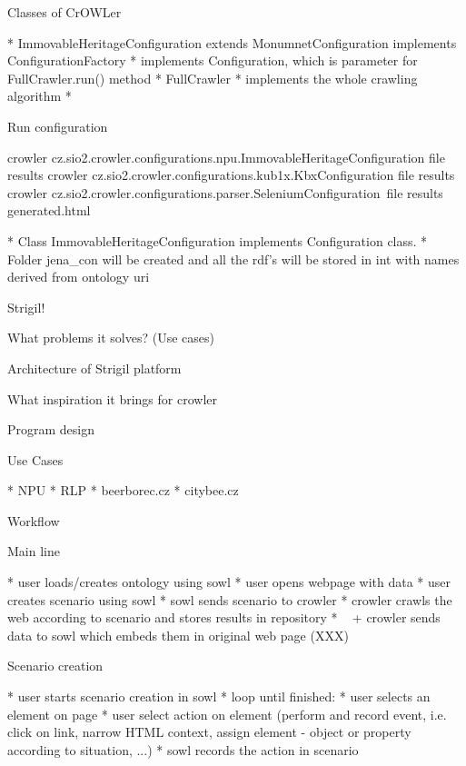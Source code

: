 \secc Classes of CrOWLer

\begitems
  * ImmovableHeritageConfiguration extends MonumnetConfiguration implements ConfigurationFactory 
  \begitems
    * implements Configuration, which is parameter for FullCrawler.run() method
  \enditems
  * FullCrawler
  \begitems
    * implements the whole crawling algorithm
    * 
  \enditems
\enditems

\secc Run configuration 

\begtt
crowler cz.sio2.crowler.configurations.npu.ImmovableHeritageConfiguration file results
crowler cz.sio2.crowler.configurations.kub1x.KbxConfiguration file results
crowler cz.sio2.crowler.configurations.parser.SeleniumConfiguration\
         file results generated.html
\endtt

\begitems
  * Class ImmovableHeritageConfiguration implements Configuration class. 
  * Folder jena\_con will be created and all the rdf's will be stored in int with names derived from ontology uri
\enditems



\sec Strigil!

\secc What problems it solves? (Use cases)

\secc Architecture of Strigil platform

\secc What inspiration it brings for crowler






\chap Program design


\sec Use Cases

\begitems
  * NPU
  * RLP
  * beerborec.cz
  * citybee.cz
\enditems



\sec Workflow

\secc Main line

\begitems
  * user loads/creates ontology using sowl
  * user opens webpage with data
  * user creates scenario using sowl
  * sowl sends scenario to crowler
  * crowler crawls the web according to scenario and stores results in repository
  * ~ + crowler sends data to sowl which embeds them in original web page (XXX)
\enditems


\secc Scenario creation

\begitems
  * user starts scenario creation in sowl
  * loop until finished:
  \begitems
    * user selects an element on page
    * user select action on element (perform and record event, i.e. click on link, narrow HTML context, assign element - object or property according to situation, ...)
    * sowl records the action in scenario
  \enditems
\enditems


